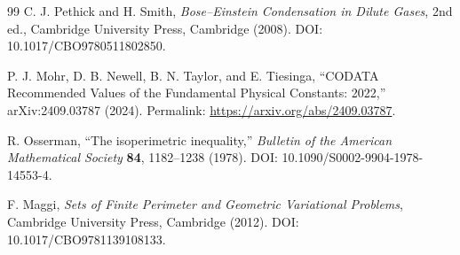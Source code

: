 \documentclass[11pt]{article}
\begin{document}
\begin{thebibliography}{99}
C. J. Pethick and H. Smith,
\emph{Bose--Einstein Condensation in Dilute Gases}, 2nd ed.,
Cambridge University Press, Cambridge (2008).
DOI: 10.1017/CBO9780511802850.

P. J. Mohr, D. B. Newell, B. N. Taylor, and E. Tiesinga,
``CODATA Recommended Values of the Fundamental Physical Constants: 2022,''
arXiv:2409.03787 (2024).
Permalink: \url{https://arxiv.org/abs/2409.03787}.

R. Osserman,
``The isoperimetric inequality,''
\emph{Bulletin of the American Mathematical Society} \textbf{84},
1182--1238 (1978).
DOI: 10.1090/S0002-9904-1978-14553-4.

F. Maggi,
\emph{Sets of Finite Perimeter and Geometric Variational Problems},
Cambridge University Press, Cambridge (2012).
DOI: 10.1017/CBO9781139108133.

\end{thebibliography}
\end{document}

